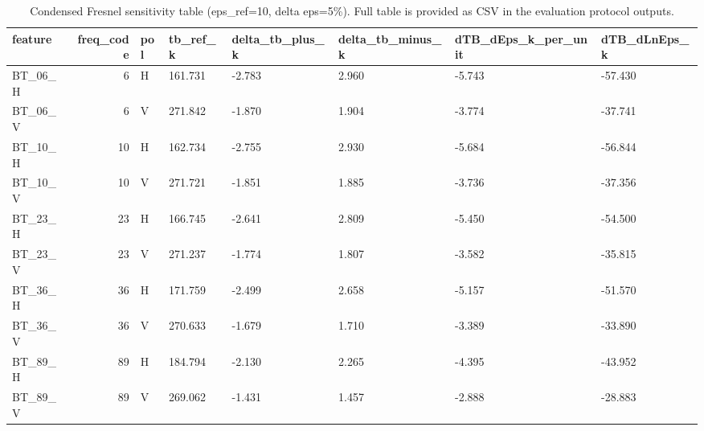 \begin{table}
\caption{Condensed Fresnel sensitivity table (eps\_ref=10, delta eps=5\%). Full table is provided as CSV in the evaluation protocol outputs.}
\label{tab:tableS10}
\begin{tabular}{lrllllll}
\toprule
feature & freq\_code & pol & tb\_ref\_k & delta\_tb\_plus\_k & delta\_tb\_minus\_k & dTB\_dEps\_k\_per\_unit & dTB\_dLnEps\_k \\
\midrule
BT\_06\_H & 6 & H & 161.731 & -2.783 & 2.960 & -5.743 & -57.430 \\
BT\_06\_V & 6 & V & 271.842 & -1.870 & 1.904 & -3.774 & -37.741 \\
BT\_10\_H & 10 & H & 162.734 & -2.755 & 2.930 & -5.684 & -56.844 \\
BT\_10\_V & 10 & V & 271.721 & -1.851 & 1.885 & -3.736 & -37.356 \\
BT\_23\_H & 23 & H & 166.745 & -2.641 & 2.809 & -5.450 & -54.500 \\
BT\_23\_V & 23 & V & 271.237 & -1.774 & 1.807 & -3.582 & -35.815 \\
BT\_36\_H & 36 & H & 171.759 & -2.499 & 2.658 & -5.157 & -51.570 \\
BT\_36\_V & 36 & V & 270.633 & -1.679 & 1.710 & -3.389 & -33.890 \\
BT\_89\_H & 89 & H & 184.794 & -2.130 & 2.265 & -4.395 & -43.952 \\
BT\_89\_V & 89 & V & 269.062 & -1.431 & 1.457 & -2.888 & -28.883 \\
\bottomrule
\end{tabular}
\end{table}

